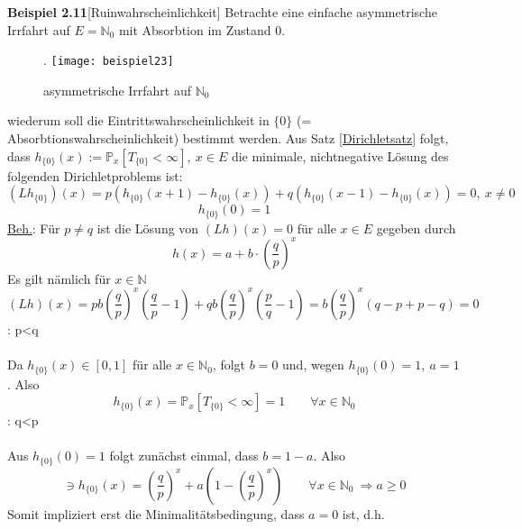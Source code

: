 \textbf{Beispiel 2.11}[Ruinwahrscheinlichkeit]
Betrachte eine einfache asymmetrische Irrfahrt auf $E = \mathbb{N}_{0}$ mit Absorbtion im Zustand 0.
\begin{figure}[H].
\centering
\texttt{[image: beispiel23]}
\caption{asymmetrische Irrfahrt auf $\mathbb{N}_{0}$}
\end{figure}
\noindent
wiederum soll die Eintrittswahrscheinlichkeit in $\lbrace 0 \rbrace$ (= Absorbtionswahrscheinlichkeit) bestimmt werden. Aus Satz \ref{Dirichletsatz} folgt, dass $h_{\lbrace 0 \rbrace}(x) := \mathbb{P}_{x}[T_{\lbrace 0 \rbrace} < \infty], \: x \in E$ die minimale, nichtnegative Lösung des folgenden Dirichletproblems ist:
\begin{equation*}
(Lh_{\lbrace 0 \rbrace})(x) = p(h_{\lbrace 0 \rbrace}(x+1) - h_{\lbrace 0 \rbrace}(x)) + q(h_{\lbrace 0 \rbrace}(x-1) - h_{\lbrace 0 \rbrace}(x)) = 0, \: x \neq 0
\end{equation*}
\begin{equation*}
h_{\lbrace 0 \rbrace}(0) = 1
\end{equation*}
\underline{Beh.}: Für $p \neq q$ ist die Lösung von $(Lh)(x) = 0$ für alle $x \in E$ gegeben durch
\begin{equation*}
h(x) = a + b \cdot (\dfrac{q}{p})^{x}
\end{equation*}
Es gilt nämlich für $x \in \mathbb{N}$
\begin{equation*}
(Lh)(x) = pb (\dfrac{q}{p})^{x}(\dfrac{q}{p} - 1) + qb (\dfrac{q}{p})^{x} (\dfrac{p}{q} - 1) = b (\dfrac{q}{p})^{x}(q-p + p-q) = 0
\end{equation*}
: p<q
\\
\\
Da $h_{\lbrace 0 \rbrace}(x) \in [0,1]$ für alle $x \in \mathbb{N}_{0}$, folgt $b=0$ und, wegen $h_{\lbrace 0 \rbrace}(0) = 1, \: a=1$. Also
\begin{equation*}
h_{\lbrace 0 \rbrace}(x) = \mathbb{P}_{x}[T_{\lbrace 0 \rbrace} < \infty] = 1 \qquad \forall x \in \mathbb{N}_{0}
\end{equation*}
: q<p
\\
\\
Aus $h_{\lbrace 0 \rbrace}(0) = 1$ folgt zunächst einmal, dass $b = 1-a$. Also
\begin{equation*}
[0,1] \ni h_{\lbrace 0 \rbrace}(x) = (\dfrac{q}{p})^{x} + a(1- (\dfrac{q}{p})^{x}) \qquad \forall x \in \mathbb{N}_{0} \: \Rightarrow a \geq 0
\end{equation*}
Somit impliziert erst die Minimalitätsbedingung, dass $a=0$ ist, d.h.
